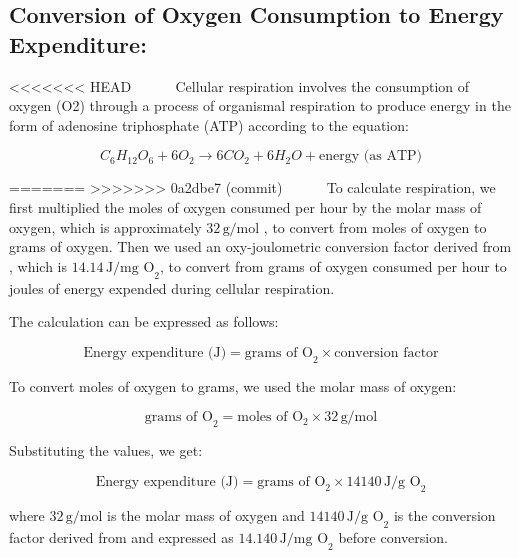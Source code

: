 \documentclass[
  12pt,
]{article}
\begin{document}
\subsection*{Conversion of Oxygen Consumption to Energy Expenditure:}

\textless\textless\textless\textless\textless\textless\textless{} HEAD
~~~~~ Cellular respiration involves the consumption of oxygen (O2)
through a process of organismal respiration to produce energy in the
form of adenosine triphosphate (ATP) \cite{babcock1992oxygen} according
to the equation:

\[
C_6H_{12}O_6 + 6O_2 \rightarrow 6CO_2 + 6H_2O + \text{energy (as ATP)}
\]

=======
\textgreater\textgreater\textgreater\textgreater\textgreater\textgreater\textgreater{}
0a2dbe7 (commit) ~~~~~ To calculate respiration, we first multiplied the
moles of oxygen consumed per hour by the molar mass of oxygen, which is
approximately \(32 \, \text{g/mol}\) \citep{hochachka1983protons}, to
convert from moles of oxygen to grams of oxygen. Then we used an
oxy-joulometric conversion factor derived from \cite{elliott1975energy},
which is \(14.14 \, \text{J/mg O}_2\), to convert from grams of oxygen
consumed per hour to joules of energy expended during cellular
respiration.

The calculation can be expressed as follows:

\[
\text{Energy expenditure (J)} = \text{grams of O}_2 \times \text{conversion factor}
\]

To convert moles of oxygen to grams, we used the molar mass of oxygen:

\[
\text{grams of O}_2 = \text{moles of O}_2 \times 32 \, \text{g/mol}
\]

Substituting the values, we get:

\[
\text{Energy expenditure (J)} = \text{grams of O}_2 \times 14140 \, \text{J/g O}_2
\]

where \(32 \, \text{g/mol}\) is the molar mass of oxygen and
\(14140 \, \text{J/g O}_2\) is the conversion factor derived from
\cite{elliott1975energy} and expressed as \(14.140 \, \text{J/mg O}_2\)
before conversion.
\end{document}

